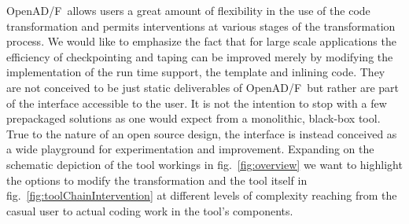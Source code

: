 \documentclass{book}
\newcommand{\OpenADF}{OpenAD/F}
\newcommand{\reffig}[1]{{fig.~\ref{#1}}}
\begin{document}
\OpenADF\ allows users a great amount of flexibility in the use of the code transformation
and permits interventions at various stages of the transformation process.
We would like to emphasize the fact that for large scale applications 
the efficiency of checkpointing and taping can be improved merely by 
modifying the implementation of the run time support, the template and inlining 
code. 
They are not conceived  to be just static 
deliverables of \OpenADF\ but rather are part of the 
interface accessible to the user.
It is not the intention to stop with a few prepackaged solutions as one 
would expect from a 
monolithic, black-box tool.  
True to the nature of an open source design, the interface is instead conceived as a 
wide playground for 
experimentation and improvement. 
Expanding on the schematic depiction 
of the tool workings in \reffig{fig:overview} we want to highlight 
the options to modify the transformation and the tool itself in \reffig{fig:toolChainIntervention} 
at different levels of complexity reaching from the casual user to 
actual coding work in the tool's components.    
\end{document}
